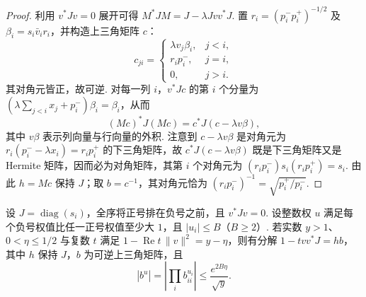 \begin{proof}
利用 $v^*Jv=0$ 展开可得 $M^*JM=J-\lambda J v v^*J$. 置 $r_i=(p_i^-p_i^+)^{-1/2}$ 及 $\beta_i=s_i\bar v_i r_i$，并构造上三角矩阵 $c$：
\[
 c_{ji}=
 \begin{cases}
        \lambda v_j\beta_i,&j<i,\\
        r_i p_i^-,&j=i,\\
        0,&j>i.
 \end{cases}
\]
其对角元皆正，故可逆. 对每一列 $i$，$v^*Jc$ 的第 $i$ 个分量为 $(\lambda\sum_{j<i}x_j+p_i^-)\beta_i=\beta_i$，从而
\[
       (Mc)^*J(Mc)=c^*J(c-\lambda v\beta),
\]
其中 $v\beta$ 表示列向量与行向量的外积. 注意到 $c-\lambda v\beta$ 是对角元为 $r_i(p_i^--\lambda x_i)=r_i p_i^+$ 的下三角矩阵，故 $c^*J(c-\lambda v\beta)$ 既是下三角矩阵又是 Hermite 矩阵，因而必为对角矩阵，其第 $i$ 个对角元为 $(r_i p_i^-)s_i(r_i p_i^+)=s_i$. 由此 $h=Mc$ 保持 $J$；取 $b=c^{-1}$，其对角元恰为 $(r_i p_i^-)^{-1}=\sqrt{p_i^+/p_i^-}$.
\end{proof}

\begin{lemma}[三角因子的权估计]
\label{lem:c-peak-triangular-weight}
\emitthmsource
设 $J=\operatorname{diag}(s_i)$，全序将正号排在负号之前，且 $v^*Jv=0$. 设整数权 $u$ 满足每个负号权值比任一正号权值至少大 $1$，且 $|u_i|\le B$（$B\ge2$）. 若实数 $y>1$、$0<\eta\le1/2$ 与复数 $t$ 满足 $1-\operatorname{Re}t\,\|v\|^2=y-\eta$，则有分解 $1-tv v^*J=hb$，其中 $h$ 保持 $J$，$b$ 为可逆上三角矩阵，且
\[
           |b^u|=\left|\prod_i b_{ii}^{u_i}\right|
                      \le \frac{e^{2B\eta}}{\sqrt y}.
\]
\end{lemma}

